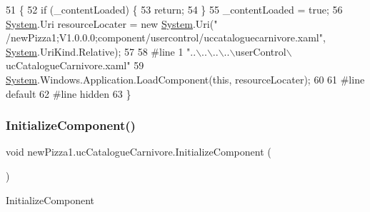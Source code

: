 \begin{DoxyCode}
51                                           \{
52             \textcolor{keywordflow}{if} (\_contentLoaded) \{
53                 \textcolor{keywordflow}{return};
54             \}
55             \_contentLoaded = \textcolor{keyword}{true};
56             \hyperlink{namespaceSystem}{System}.Uri resourceLocater = \textcolor{keyword}{new} \hyperlink{namespaceSystem}{System}.Uri(\textcolor{stringliteral}{"
      /newPizza1;V1.0.0.0;component/usercontrol/uccataloguecarnivore.xaml"}, \hyperlink{namespaceSystem}{System}.UriKind.Relative);
57             
58 \textcolor{preprocessor}{            #line 1 "..\(\backslash\)..\(\backslash\)..\(\backslash\)..\(\backslash\)userControl\(\backslash\)ucCatalogueCarnivore.xaml"}
59             \hyperlink{namespaceSystem}{System}.Windows.Application.LoadComponent(\textcolor{keyword}{this}, resourceLocater);
60             
61 \textcolor{preprocessor}{            #line default}
62 \textcolor{preprocessor}{            #line hidden}
63         \}
\end{DoxyCode}
\mbox{\label{classnewPizza1_1_1ucCatalogueCarnivore_ae3fbe460c9b1305f8cd5d685e12746ae}} 
\subsubsection{\texorpdfstring{Initialize\+Component()}{InitializeComponent()}\hspace{0.1cm}{\footnotesize\ttfamily [5/6]}}
{\footnotesize\ttfamily void new\+Pizza1.\+uc\+Catalogue\+Carnivore.\+Initialize\+Component (\begin{DoxyParamCaption}{ }\end{DoxyParamCaption})\hspace{0.3cm}{\ttfamily [inline]}}



Initialize\+Component 


